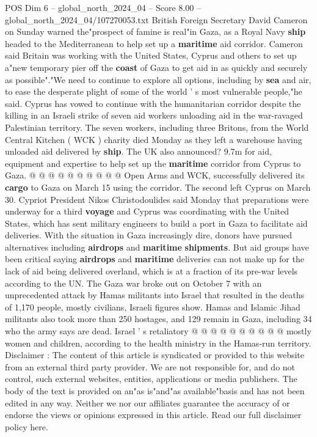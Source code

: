 \begin{textsample}{POS Dim 6 – global\_north\_2024\_04 – Score 8.00 – global\_north\_2024\_04/107270053.txt}  \label{ex:f6_pos_113}
British Foreign Secretary David Cameron on Sunday warned the"prospect of famine is real"in Gaza, as a Royal Navy \textbf{ship} headed to the Mediterranean to help set up a \textbf{maritime} aid corridor.
Cameron said Britain was working with the United States, Cyprus and others to set up a"new temporary pier off the \textbf{coast} of Gaza to get aid in as quickly and securely as possible"."We need to continue to explore all options, including by \textbf{sea} and air, to ease the desperate plight of some of the world ' s most vulnerable people,"he said.
Cyprus has vowed to continue with the humanitarian corridor despite the killing in an Israeli strike of seven aid workers unloading aid in the war-ravaged Palestinian territory.
The seven workers, including three Britons, from the World Central Kitchen ( WCK ) charity died Monday as they left a warehouse having unloaded aid delivered by \textbf{ship}.
The UK also announced? 9.7m for aid, equipment and expertise to help set up the \textbf{maritime} corridor from Cyprus to Gaza. @ @ @ @ @ @ @ @ @ @ Open Arms and WCK, successfully delivered its \textbf{cargo} to Gaza on March 15 using the corridor.
The second left Cyprus on March 30.
Cypriot President Nikos Christodoulides said Monday that preparations were underway for a third \textbf{voyage} and Cyprus was coordinating with the United States, which has sent military engineers to build a port in Gaza to facilitate aid deliveries.
With the situation in Gaza increasingly dire, donors have pursued alternatives including \textbf{airdrops} and \textbf{maritime} \textbf{shipments}.
But aid groups have been critical saying \textbf{airdrops} and \textbf{maritime} deliveries can not make up for the lack of aid being delivered overland, which is at a fraction of its pre-war levels according to the UN.
The Gaza war broke out on October 7 with an unprecedented attack by Hamas militants into Israel that resulted in the deaths of 1,170 people, mostly civilians, Israeli figures show.
Hamas and Islamic Jihad militants also took more than 250 hostages, and 129 remain in Gaza, including 34 who the army says are dead.
Israel ' s retaliatory @ @ @ @ @ @ @ @ @ @ mostly women and children, according to the health ministry in the Hamas-run territory.
Disclaimer : The content of this article is syndicated or provided to this website from an external third party provider.
We are not responsible for, and do not control, such external websites, entities, applications or media publishers.
The body of the text is provided on an"as is"and"as available"basis and has not been edited in any way.
Neither we nor our affiliates guarantee the accuracy of or endorse the views or opinions expressed in this article.
Read our full disclaimer policy here.

\end{textsample}

